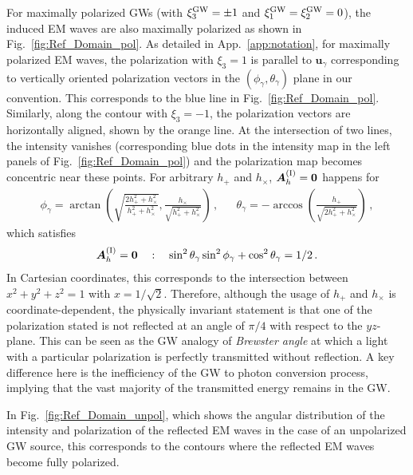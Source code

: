 \documentclass[a4paper,11pt]{article}
\begin{document}
For maximally polarized GWs (with $ \xi_{3}^{\rm GW} = \pm  1$ and $ \xi_{1}^{\rm GW} = \xi_{2}^{\rm GW} = 0 $), the induced EM waves are also maximally polarized as shown in Fig.~\ref{fig:Ref_Domain_pol}.
%
As detailed in App.~\ref{app:notation}, for maximally polarized EM waves, the polarization with $ \xi_{3} = 1 $ is parallel to $ \bm{u}_{\gamma} $ corresponding to vertically oriented polarization vectors in the $ ( \phi_{\gamma}, \theta_{\gamma} ) $ plane in our convention.
%
This corresponds to the blue line in Fig.~\ref{fig:Ref_Domain_pol}. 
%
Similarly, along the contour with $ \xi_{3} = - 1 $, the polarization vectors are horizontally aligned, shown by the orange line.
%
At the intersection of two lines, the intensity vanishes (corresponding blue dots in the intensity map in the left panels of Fig.~\ref{fig:Ref_Domain_pol}) and the polarization map becomes concentric near these points.
%
For arbitrary $ h_{+} $ and $ h_{\times} $, $ \bm{A}_{h}^{\rm (I)} = \bm{0} $ happens for
%
\begin{align}
    \phi_{\gamma} = \arctan \left( \sqrt{ \frac{2h_{+}^{2} + h_{\times}^{2}}{h_{+}^{2} + h_{\times}^{2} } } , \frac{h_{\times}}{\sqrt{h_{+}^{2} + h_{\times}^{2} }}  \right) \,, &&
    \theta_{\gamma} = -\arccos \left( \frac{h_{+}}{\sqrt{2 h_{+}^{2} + h_{\times}^{2} }} \right)\,,
\end{align}
%
which satisfies 
%
\begin{align}
    \bm{A}_{h}^{\rm (I)} = \bm{0} \quad:\quad \sin^{2} \theta_{\gamma} \sin^{2} \phi_{\gamma} + \cos^{2} \theta_{\gamma} = 1/2 \,.
\end{align}
%
In Cartesian coordinates, this corresponds to the intersection between $ x^{2} + y^{2} + z^{2} = 1 $ with $ x = 1/ \sqrt{2}$.
%
Therefore, although the usage of $ h_{+} $ and $ h_{\times} $ is coordinate-dependent, the physically invariant statement is that one of the polarization stated is not reflected at an angle of $\pi/4$ with respect to the $yz$-plane. 
%
This can be seen as the GW analogy of \textit{Brewster angle} at which a light with a particular polarization is perfectly transmitted without reflection.
%
A key difference here is the inefficiency of the GW to photon conversion process, implying that the vast majority of the transmitted energy remains in the GW.


In Fig.~\ref{fig:Ref_Domain_unpol}, which shows the angular distribution of the intensity and polarization of the reflected EM waves in the case of an unpolarized GW source, this corresponds to the contours where the reflected EM waves become fully polarized.
\end{document}
